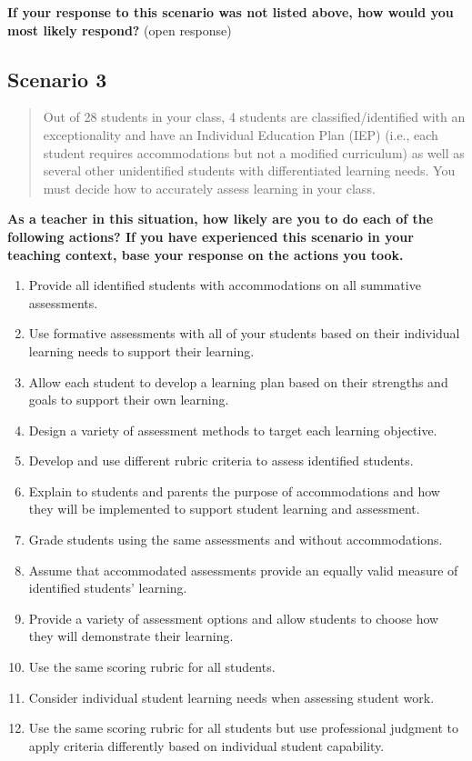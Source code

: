 \documentclass[
]{book}
\providecommand{\tightlist}{%
  \setlength{\itemsep}{0pt}\setlength{\parskip}{0pt}}
\begin{document}
\textbf{If your response to this scenario was not listed above, how would you most likely respond?} (open response)

\hypertarget{scenario-3}{%
\subsection{Scenario 3}\label{scenario-3}}

\begin{quote}
Out of 28 students in your class, 4 students are classified/identified with an exceptionality and have an Individual Education Plan (IEP) (i.e., each student requires accommodations but not a modified curriculum) as well as several other unidentified students with differentiated learning needs. You must decide how to accurately assess learning in your class.
\end{quote}

\textbf{As a teacher in this situation, how likely are you to do each of the following actions? If you have experienced this scenario in your teaching context, base your response on the actions you took.}

\begin{enumerate}
\def\labelenumi{\arabic{enumi}.}
\tightlist
\item
  Provide all identified students with accommodations on all summative assessments.
\item
  Use formative assessments with all of your students based on their individual learning needs to support their learning.
\item
  Allow each student to develop a learning plan based on their strengths and goals to support their own learning.
\item
  Design a variety of assessment methods to target each learning objective.
\item
  Develop and use different rubric criteria to assess identified students.
\item
  Explain to students and parents the purpose of accommodations and how they will be implemented to support student learning and assessment.
\item
  Grade students using the same assessments and without accommodations.
\item
  Assume that accommodated assessments provide an equally valid measure of identified students' learning.
\item
  Provide a variety of assessment options and allow students to choose how they will demonstrate their learning.
\item
  Use the same scoring rubric for all students.
\item
  Consider individual student learning needs when assessing student work.
\item
  Use the same scoring rubric for all students but use professional judgment to apply criteria differently based on individual student capability.
\end{enumerate}
\end{document}
